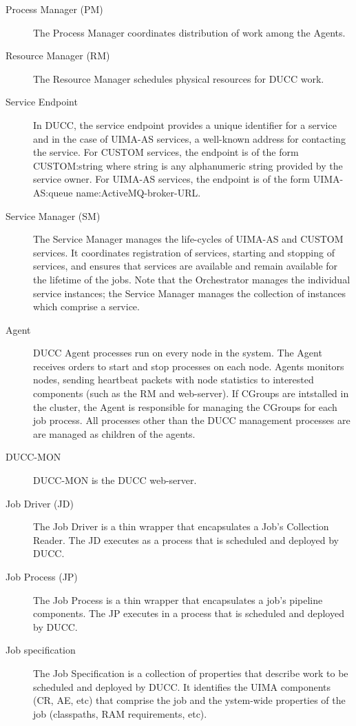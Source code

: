 \begin{description}
\item[Process Manager (PM) ] The Process Manager coordinates distribution of work among the Agents.

\item[Resource Manager (RM) ] The Resource Manager schedules physical resources for DUCC work.

\item[Service Endpoint] In DUCC, the service endpoint provides a unique identifier for a service
  and in the case of UIMA-AS services, a well-known address for contacting the service. For CUSTOM
  services, the endpoint is of the form CUSTOM:string where string is any alphanumeric string
  provided by the service owner. For UIMA-AS services, the endpoint is of the form UIMA-AS:queue
  name:ActiveMQ-broker-URL.

\item[Service Manager (SM)] The Service Manager manages the life-cycles of UIMA-AS and CUSTOM
  services. It coordinates registration of services, starting and stopping of services, and ensures
  that services are available and remain available for the lifetime of the jobs.  Note that the
  Orchestrator manages the individual service instances; the Service Manager manages the collection
  of instances which comprise a service.

\item[Agent] DUCC Agent processes run on every node in the system. The Agent receives orders to
  start and stop processes on each node. Agents monitors nodes, sending heartbeat packets with node
  statistics to interested components (such as the RM and web-server). If CGroups are intstalled in
  the cluster, the Agent is responsible for managing the CGroups for each job process. All processes
  other than the DUCC management processes are are managed as children of the agents.

\item[DUCC-MON]  DUCC-MON is the DUCC web-server.

\item[Job Driver (JD)]The Job Driver is a thin wrapper that encapsulates a Job's Collection
  Reader. The JD executes as a process that is scheduled and deployed by DUCC.

\item[Job Process (JP)] The Job Process is a thin wrapper that encapsulates a job's pipeline
  components. The JP executes in a process that is scheduled and deployed by DUCC.

\item[Job specification] The Job Specification is a collection of properties that describe work to be
  scheduled and deployed by DUCC. It
  identifies the UIMA components (CR, AE, etc) that comprise the job and the ystem-wide
  properties of the job (classpaths, RAM requirements, etc). 


\end{description}
